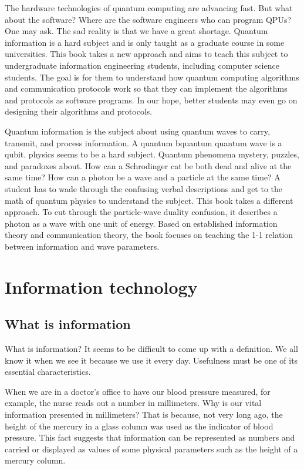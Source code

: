 \documentclass[oneside, letter, 12pt]{book}
\begin{document}
The hardware technologies of quantum computing are advancing fast. But what about the software? Where are the software engineers who can program QPUs? One may ask. The sad reality is that we have a great shortage. Quantum information is a hard subject and is only taught as a graduate course in some universities. This book takes a new approach and aims to teach this subject to undergraduate information engineering students, including computer science students. The goal is for them to understand how quantum computing algorithms and communication protocols work so that they can implement the algorithms and protocols as software programs. In our hope, better students may even go on designing their algorithms and protocols.

Quantum information is the subject about using quantum waves to carry, transmit, and process information. A quantum bquantum quantum wave is a qubit. physics seems to be a hard subject. Quantum phenomena mystery, puzzles, and paradoxes about. How can a Schrodinger cat be both dead and alive at the same time? How can a photon be a wave and a particle at the same time? A student has to wade through the confusing verbal descriptions and get to the math of quantum physics to understand the subject. This book takes a different approach. To cut through the particle-wave duality confusion, it describes a photon as a wave with one unit of energy. Based on established information theory and communication theory, the book focuses on teaching the 1-1 relation between information and wave parameters.

\section{Information technology}
\subsection{What is information}
What is information? It seems to be difficult to come up with a definition. We all know it when we see it because we use it every day. Usefulness must be one of its essential characteristics.

When we are in a doctor's office to have our blood pressure measured, for example, the nurse reads out a number in millimeters. Why is our vital information presented in millimeters? That is because, not very long ago, the height of the mercury in a glass column was used as the indicator of blood pressure. This fact suggests that information can be represented as numbers and carried or displayed as values of some physical parameters such as the height of a mercury column.
\end{document}

